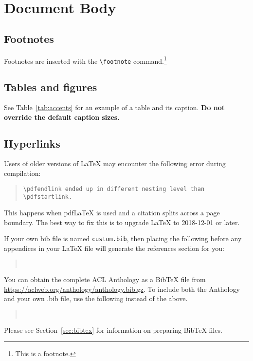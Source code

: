 \documentclass[11pt]{article}
\begin{document}
\section{Document Body}


\subsection{Footnotes}

Footnotes are inserted with the \verb|\footnote| command.\footnote{This is a footnote.}

\subsection{Tables and figures}

See Table~\ref{tab:accents} for an example of a table and its caption.
\textbf{Do not override the default caption sizes.}

\subsection{Hyperlinks}

Users of older versions of \LaTeX{} may encounter the following error during compilation: 
\begin{quote}
\tt\verb|\pdfendlink| ended up in different nesting level than \verb|\pdfstartlink|.
\end{quote}
This happens when pdf\LaTeX{} is used and a citation splits across a page boundary. The best way to fix this is to upgrade \LaTeX{} to 2018-12-01 or later.

If your own bib file is named \texttt{custom.bib}, then placing the following before any appendices in your \LaTeX{} file will generate the references section for you:
\begin{quote}
\begin{verbatim}


\end{verbatim}
\end{quote}
You can obtain the complete ACL Anthology as a Bib\TeX{} file from \url{https://aclweb.org/anthology/anthology.bib.gz}.
To include both the Anthology and your own .bib file, use the following instead of the above.
\begin{quote}
\begin{verbatim}


\end{verbatim}
\end{quote}
Please see Section~\ref{sec:bibtex} for information on preparing Bib\TeX{} files.
\end{document}
